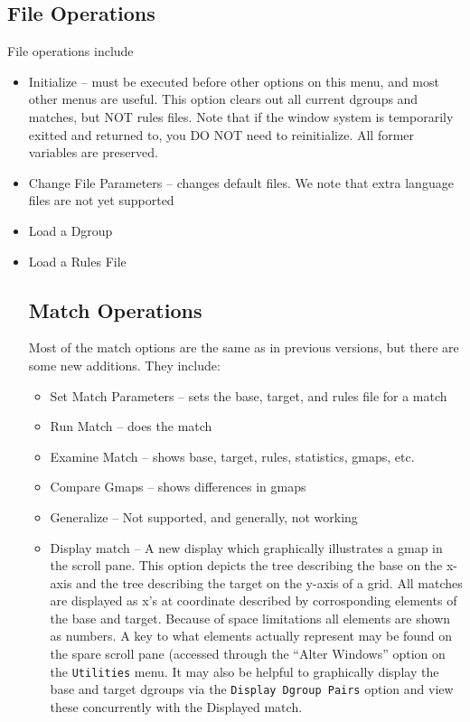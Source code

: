 \begin{center}
\subsection {File Operations}
File operations include 
\begin{itemize}
\item Initialize  -- must be executed before other options on this
menu, and most other menus are useful. This option clears out all
current dgroups and matches, but NOT rules files. Note that if the
window system is temporarily exitted and returned to, you DO NOT need
to reinitialize. All former variables are preserved.
\item Change File Parameters -- changes default files. We note that
extra language files are not yet supported
\item Load a Dgroup
\item Load a Rules File
\subsection {Match Operations}
Most of the match options are the same as in previous versions, but
there are some new additions. They include:
\begin{itemize}
\item Set Match Parameters -- sets the base, target, and rules file
for a match
\item Run Match -- does the match
\item Examine Match -- shows base, target, rules, statistics, gmaps, etc.
\item Compare Gmaps -- shows differences in gmaps
\item Generalize -- Not supported, and generally, not working
\item Display match -- A new display which graphically illustrates a
gmap in the scroll pane. This option depicts the tree describing the
base on the x-axis and the tree describing the target on the y-axis of
a grid. All matches are displayed as x's at coordinate described by
corrosponding elements of the base and target. Because of space
limitations all elements are shown as numbers. A key to what elements
actually represent may be found on the spare scroll pane (accessed
through the ``Alter Windows'' option on the {\tt Utilities} menu. It
may also be helpful to graphically display the base and target dgroups
via the {\tt Display Dgroup Pairs} option and view these concurrently
with the Displayed match.
\end{itemize}


\end{itemize}
\end{center}
